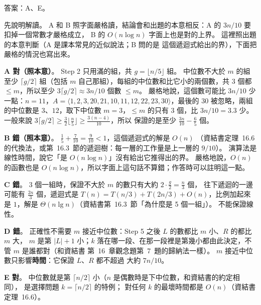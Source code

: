 \begin{pastsoln}
答案：A、E。

先說明解讀。 A 和 B 照字面嚴格讀，結論會和出題的本意相反：A 的 $3n/10$ 要扣掉一個常數才嚴格成立，
B 的 $O(n \log n)$ 字面上也是對的上界。 這裡照出題的本意判斷（A 是課本常見的近似說法；B 問的是
這個遞迴式給出的界），下面把嚴格的情況也寫出來。

\textbf{A 對（照本意）}。 Step 2 只用滿的組，共 $g = \lfloor n/5 \rfloor$ 組。 中位數不大於 $m$ 的組
至少 $\lceil g/2 \rceil$ 組（包括 $m$ 自己那組），每組的中位數和比它小的兩個數，共 $3$ 個都
$\le m$，所以至少 $3\lceil g/2 \rceil \approx 3n/10$ 個數 $\le m$。 嚴格地說，這個數可能比
$3n/10$ 少一點：$n = 11$，$A = \langle 1, 2, 3, 20, 21, 10, 11, 12, 22, 23, 30 \rangle$，最後的 $30$
被忽略，兩組的中位數是 $3$、$12$，取下中位數 $m = 3$，$\le m$ 的只有 $3$ 個，比 $3n/10 = 3.3$ 少。
一般來說 $3\lceil g/2 \rceil \ge \frac{3}{2}\lfloor \frac{n}{5} \rfloor \ge \frac{3(n-4)}{10}$，所以
保證的是至少 $\frac{3n}{10} - \frac{6}{5}$ 個。

\textbf{B 錯（照本意）}。 $\frac{1}{5} + \frac{7}{10} = \frac{9}{10} < 1$，這個遞迴式的解是 $O(n)$
（資結書定理~16.6 的代換法，或第~16.3~節的遞迴樹：每一層的工作量是上一層的 $9/10$）。 演算法是
線性時間，說它「是 $O(n \log n)$」沒有給出它推得出的界。 嚴格地說，$O(n)$ 的函數也是
$O(n \log n)$，所以字面上這句話不算錯；作答時可以註明這一點。

\textbf{C 錯}。 $3$ 個一組時，保證不大於 $m$ 的數只有大約 $2 \cdot \frac{g}{2} = \frac{n}{3}$ 個，
往下遞迴的一邊可能有 $\frac{2n}{3}$ 個，遞迴式是 $T(n) = T(n/3) + T(2n/3) + O(n)$，比例加起來是
$1$，解是 $\Theta(n \lg n)$（資結書第~16.3~節「為什麼是 5 個一組」）。 不能保證線性。

\textbf{D 錯}。 正確性不需要 $m$ 接近中位數：Step 5 之後 $L$ 的數都比 $m$ 小、$R$ 的都比 $m$ 大，
$m$ 是第 $|L| + 1$ 小；$k$ 落在哪一段、在那一段裡是第幾小都由此決定，不管 $m$ 是誰都對（和資結書
第~16~章觀念題第~7~題的歸納法一樣）。 $m$ 接近中位數只影響\textbf{時間}：它保證 $L$、$R$ 都不超過
大約 $7n/10$。

\textbf{E 對}。 中位數就是第 $\lceil n/2 \rceil$ 小（$n$ 是偶數時是下中位數，和資結書的約定相同），
是選擇問題 $k = \lceil n/2 \rceil$ 的特例； 對任何 $k$ 的最壞時間都是 $O(n)$（資結書
定理~16.6）。
\end{pastsoln}
